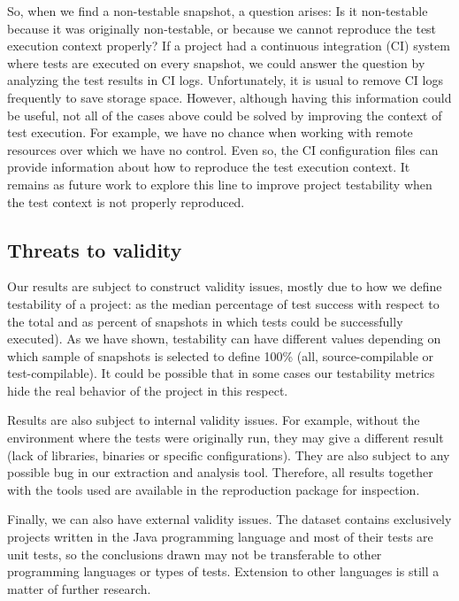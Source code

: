 So, when we find a non-testable snapshot, a question arises: Is it non-testable because it was originally non-testable, or because we cannot reproduce the test execution context properly? 
If a project had a continuous integration (CI) system where tests are executed on every snapshot, we could answer the question by analyzing the test results in CI logs. Unfortunately, it is usual to remove CI logs frequently to save storage space. 
However, although having this information could be useful, not all of the cases above could be solved by improving the context of test execution. 
For example, we have no chance when working with remote resources over which we have no control.
Even so, the CI configuration files can provide information about how to reproduce the test execution context.
It remains as future work to explore this line to improve project testability when the test context is not properly reproduced. 


\subsection{Threats to validity}

Our results are subject to construct validity issues, mostly due to how we define testability of a project: as the median percentage of test success with respect to the total and as percent of snapshots in which tests could be successfully executed). 
As we have shown, testability can have different values depending on which sample of snapshots is selected to define 100\% (all, source-compilable or test-compilable). 
It could be possible that in some cases our testability metrics hide the real behavior of the project in this respect.

Results are also subject to internal validity issues. 
For example, without the environment where the tests were originally run, they may give a different result (lack of libraries, binaries or specific configurations). 
They are also subject to any possible bug in our extraction and analysis tool. 
Therefore, all results together with the tools used are available in the reproduction package for inspection.

Finally, we can also have external validity issues. 
The dataset contains exclusively projects written in the Java programming language and most of their tests are unit tests, so the conclusions drawn may not be transferable to other programming languages or types of tests. 
Extension to other languages is still a matter of further research.
